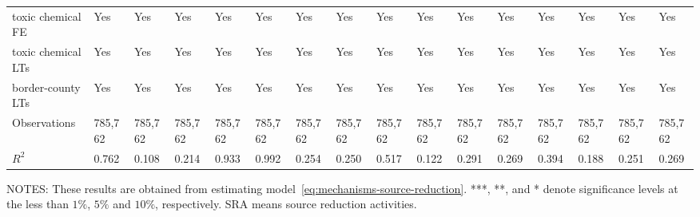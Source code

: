 \begin{table}[H]
{\begin{tabular}{@{}llllllllllllllll@{}}
            toxic chemical FE           & Yes      & Yes             & Yes             & Yes        & Yes                   & Yes           & Yes      & Yes       & Yes                  & Yes                 & Yes      & Yes                   & Yes                       & Yes                         & Yes                         \\
            toxic chemical LTs          & Yes      & Yes             & Yes             & Yes        & Yes                   & Yes           & Yes      & Yes       & Yes                  & Yes                 & Yes      & Yes                   & Yes                       & Yes                         & Yes                         \\
            border-county LTs           & Yes      & Yes             & Yes             & Yes        & Yes                   & Yes           & Yes      & Yes       & Yes                  & Yes                 & Yes      & Yes                   & Yes                       & Yes                         & Yes                         \\ \midrule
            Observations                & 785,762  & 785,762         & 785,762         & 785,762    & 785,762               & 785,762       & 785,762  & 785,762   & 785,762                 & 785,762                    & 785,762  & 785,762    & 785,762 & 785,762 & 785,762         \\
            $R^2$                       & 0.762    & 0.108           & 0.214           & 0.933      & 0.992                 & 0.254         & 0.250    & 0.517     & 0.122                & 0.291               & 0.269    & 0.394                 & 0.188                    & 0.251 & 0.269      \\ \bottomrule\bottomrule
        \end{tabular}%
    }
    \begin{minipage}{\columnwidth}
        \vspace{0.05in}
        \tiny NOTES: These results are obtained from estimating model~\ref{eq:mechanisms-source-reduction}. ***, **, and * denote significance levels at the less than $1\%$, $5\%$ and $10\%$, respectively. SRA means source reduction activities.
    \end{minipage}
\end{table}